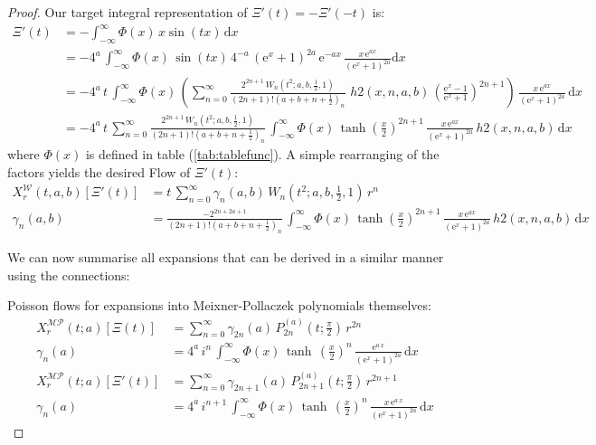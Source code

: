 \documentclass[a4paper,11pt,twoside]{amsart}
\newcommand{\verifiedeq}{=}
\newcommand{\verifiedeq}{\stackrel{\checkmark}{=}}
\begin{document}
\begin{proof}
Our target integral representation of $\Xi'(t) = -\Xi'(-t)$ is:
\begin{align}
 \Xi'(t) &\verifiedeq -\int_{-\infty}^\infty \Phi(x)\,x\sin(tx)\, \mathrm{d}x \\
 &\verifiedeq -4^a\,\int_{-\infty}^\infty \Phi(x)\,\sin(tx)\,4^{-a}\,(\mathrm{e}^x+1)^{2a}\,\mathrm{e}^{-ax} \,\frac{x\,\mathrm{e}^{ax}}{(\mathrm{e}^x+1)^{2a}} \mathrm{d}x \\
 &\verifiedeq -4^a\,t\,\int_{-\infty}^\infty \Phi(x)\,\left(\sum_{n=0}^\infty \frac{2^{2n+1}\,W_n\left(t^2;a,b,\frac12,1\right)}{(2n+1)!\left(a+b+n+\frac12\right)_n}\, \,h2(x,n,a,b)\,\left(\frac{\textrm{e}^{x}-1}{\textrm{e}^{x}+1}\right)^{2n+1}\right)\,\frac{x\,\mathrm{e}^{ax}}{(\mathrm{e}^x+1)^{2a}}\, \mathrm{d}x \\
 &\verifiedeq -4^a\,t\,\sum_{n=0}^\infty \frac{2^{2n+1}\,W_n\left(t^2;a,b,\frac12,1\right)}{(2n+1)!\left(a+b+n+\frac12\right)_n}\,\int_{-\infty}^{\infty} \Phi(x)\,\tanh\left(\frac{x}{2}\right)^{2n+1}\,\frac{x\,\mathrm{e}^{ax}}{(\mathrm{e}^x+1)^{2a}}\,h2(x,n,a,b)\,\mathrm{d}x
\end{align}
where $\Phi(x)$ is defined in table (\ref{tab:tablefunc}). A simple rearranging of the factors yields the desired Flow of $\Xi'(t)$:
\begin{align}
X^\mathcal{W}_r(t,a,b)\left[\Xi'(t)\right] &\verifiedeq t\,\sum_{n=0}^\infty \gamma_n(a,b)\,W_n\left(t^2;a,b,\frac12,1\right)\,r^n \\
  \gamma_n(a,b) &\verifiedeq \frac{-2^{2n+2a+1}}{(2n+1)!\left(a+b+n+\frac12\right)_n}\,\int_{-\infty}^{\infty} \Phi(x)\,\tanh\left(\frac{x}{2}\right)^{2n+1}\,\frac{x\,\mathrm{e}^{ax}}{(\mathrm{e}^x+1)^{2a}}\,h2(x,n,a,b)\,\mathrm{d}x
\end{align}

We can now summarise all expansions that can be derived in a similar manner using the connections:

Poisson flows for expansions into Meixner-Pollaczek polynomials themselves:
\begin{align}
X^\mathcal{MP}_r(t;a)\left[\Xi(t)\right] &\verifiedeq \sum_{n=0}^\infty \gamma_{2n}(a)\,P_{2n}^{(a)}\left(t;\frac{\pi}{2}\right)\,r^{2n} \\
\gamma_n(a) &\verifiedeq 4^a\,i^n\,\int_{-\infty}^{\infty} \Phi(x)\,\tanh\,\left(\frac{x}{2}\right)^n\,\frac{\textrm{e}^{a\,x}}{(\textrm{e}^x+1)^{2a}}\,\mathrm{d}x \\
X^\mathcal{MP}_r(t;a)\left[\Xi'(t)\right] &\verifiedeq \sum_{n=0}^\infty \gamma_{2n+1}(a)\,P_{2n+1}^{(a)}\left(t;\frac{\pi}{2}\right)\,r^{2n+1} \\
\gamma_n(a) &\verifiedeq 4^a\,i^{n+1}\,\int_{-\infty}^{\infty} \Phi(x)\,\tanh\,\left(\frac{x}{2}\right)^n\,\frac{x\,\textrm{e}^{a\,x}}{(\textrm{e}^x+1)^{2a}}\,\mathrm{d}x
\end{align}


\end{proof}
\end{document}
